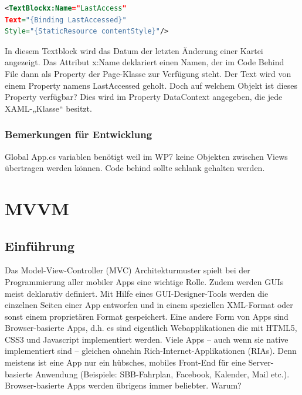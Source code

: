\documentclass[a4paper,10pt]{scrreprt}
\begin{document}
\begin{lstlisting}[caption=Data Binding Example,language=xml]
 <TextBlockx:Name="LastAccess"
Text="{Binding LastAccessed}"
Style="{StaticResource contentStyle}"/>

\end{lstlisting}
In diesem Textblock wird das Datum der letzten Änderung einer Kartei angezeigt. Das Attribut x:Name deklariert
einen Namen, der im Code Behind File dann als Property der Page-Klasse zur Verfügung steht. Der Text wird von
einem Property namens LastAccessed geholt. Doch auf welchem Objekt ist dieses Property verfügbar? Dies wird
im Property DataContext angegeben, die jede XAML-„Klasse“ besitzt.


\subsection{Bemerkungen für Entwicklung}
Global App.cs variablen benötigt weil im WP7 keine Objekten zwischen Views übertragen werden können.
Code behind sollte schlank gehalten werden.

\chapter{MVVM}
\section{Einführung}
Das Model-View-Controller (MVC) Architekturmuster spielt bei der Programmierung aller mobiler Apps eine
wichtige Rolle. Zudem werden GUIs meist deklarativ definiert. Mit Hilfe eines GUI-Designer-Tools werden die
einzelnen Seiten einer App entworfen und in einem speziellen XML-Format oder sonst einem proprietären
Format gespeichert. Eine andere Form von Apps sind Browser-basierte Apps, d.h. es sind eigentlich
Webapplikationen die mit HTML5, CSS3 und Javascript implementiert werden.
Viele Apps – auch wenn sie native implementiert sind – gleichen ohnehin Rich-Internet-Applikationen (RIAs).
Denn meistens ist eine App nur ein hübsches, mobiles Front-End für eine Server-basierte Anwendung (Beispiele:
SBB-Fahrplan, Facebook, Kalender, Mail etc.). Browser-basierte Apps werden übrigens immer beliebter.
Warum?
\end{document}
